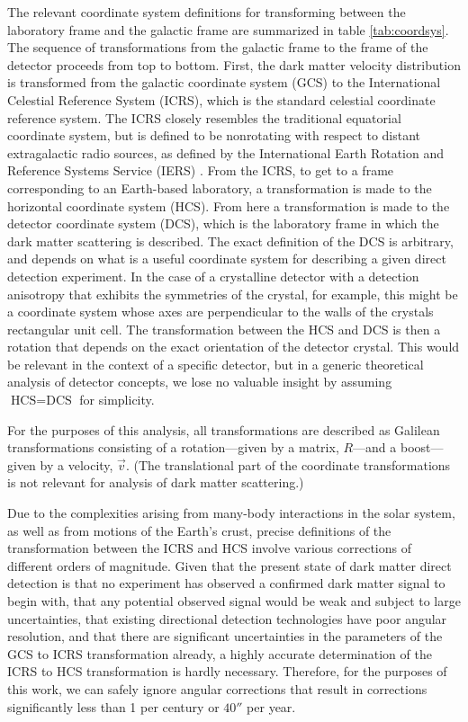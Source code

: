 The relevant coordinate system definitions for transforming between the laboratory frame and the galactic frame are summarized in table \ref{tab:coordsys}. The sequence of transformations from the galactic frame to the frame of the detector proceeds from top to bottom. First, the dark matter velocity distribution is transformed from the galactic coordinate system (GCS) to the International Celestial Reference System (ICRS), which is the standard celestial coordinate reference system. The ICRS closely resembles the traditional equatorial coordinate system, but is defined to be nonrotating with respect to distant extragalactic radio sources, as defined by the International Earth Rotation and Reference Systems Service (IERS) \parencite{MaFeissel1997}. From the ICRS, to get to a frame corresponding to an Earth-based laboratory, a transformation is made to the horizontal coordinate system (HCS). From here a transformation is made to the detector coordinate system (DCS), which is the laboratory frame in which the dark matter scattering is described. The exact definition of the DCS is arbitrary, and depends on what is a useful coordinate system for describing a given direct detection experiment. In the case of a crystalline detector with a detection anisotropy that exhibits the symmetries of the crystal, for example, this might be a coordinate system whose axes are perpendicular to the walls of the crystals rectangular unit cell. The transformation between the HCS and DCS is then a rotation that depends on the exact orientation of the detector crystal. This would be relevant in the context of a specific detector, but in a generic theoretical analysis of detector concepts, we lose no valuable insight by assuming $\text{HCS}=\text{DCS}$ for simplicity.

For the purposes of this analysis, all transformations are described as Galilean transformations consisting of a rotation---given by a matrix, $R$---and a boost---given by a velocity, $\vec{v}$. (The translational part of the coordinate transformations is not relevant for analysis of dark matter scattering.)

Due to the complexities arising from many-body interactions in the solar system, as well as from motions of the Earth's crust, precise definitions of the transformation between the ICRS and HCS involve various corrections of different orders of magnitude. Given that the present state of dark matter direct detection is that no experiment has observed a confirmed dark matter signal to begin with, that any potential observed signal would be weak and subject to large uncertainties, that existing directional detection technologies have poor angular resolution, and that there are significant uncertainties in the parameters of the GCS to ICRS transformation already, a highly accurate determination of the ICRS to HCS transformation is hardly necessary. Therefore, for the purposes of this work, we can safely ignore angular corrections that result in corrections significantly less than 1\degree{} per century or $40''$ per year.

